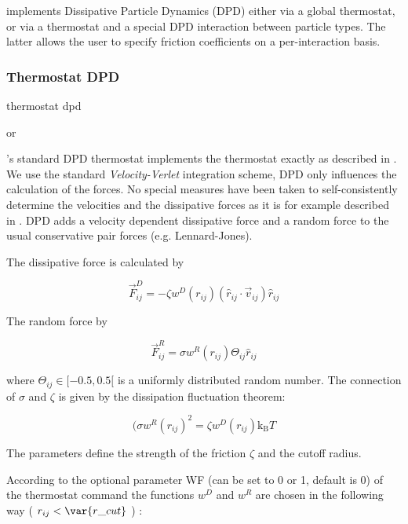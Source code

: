 \es implements Dissipative Particle Dynamics (DPD) either via a global
thermostat, or via a thermostat and a special DPD interaction between
particle types.  The latter allows the user to specify friction
coefficients on a per-interaction basis.

\subsubsection{Thermostat DPD}

\begin{essyntax}
  thermostat dpd    
  \begin{features}
     or 
  \end{features}
\end{essyntax}

\es's standard DPD thermostat implements the thermostat exactly as
described in \cite{soddeman03a}.  We use the standard
\textit{Velocity-Verlet} integration scheme, \eg DPD only influences
the calculation of the forces. No special measures have been taken to
self-consistently determine the velocities and the dissipative forces
as it is for example described in \cite{Nikunen03}.  DPD adds a
velocity dependent dissipative force and a random force to the usual
conservative pair forces (e.g. Lennard-Jones).

The dissipative force is calculated by

$$ \vec{F}_{ij}^{D} = -\zeta w^D (r_{ij}) (\hat{r}_{ij} \cdot \vec{v}_{ij}) \hat{r}_{ij} $$

The random force by

$$ \vec{F}_{ij}^R = \sigma w^R (r_{ij}) \Theta_{ij} \hat{r}_{ij} $$

where $ \Theta_{ij} \in [ -0.5 , 0.5 [ $ is a uniformly distributed random number.
The connection of $\sigma $ and $\zeta $ is given by the dissipation fluctuation theorem:
 
$$ (\sigma w^R (r_{ij})^2=\zeta w^D (r_{ij}) \text{k}_\text{B} T $$

The parameters   define the strength of the
friction $\zeta$ and the cutoff radius.

According to the optional parameter WF (can be set to 0 or 1, default
is 0) of the thermostat command the functions $w^D$ and $w^R$ are
chosen in the following way ( $ r_{ij} < \var{r\_cut} $ ) :

